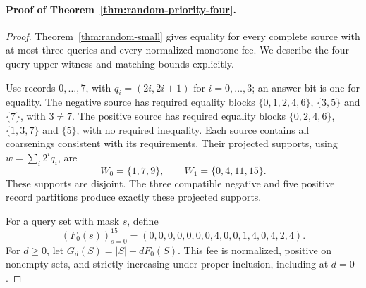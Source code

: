 \documentclass[pdflatex,sn-mathphys-num]{sn-jnl}
\theoremstyle{thmstyleone}
\theoremstyle{thmstylethree}
\theoremstyle{thmstyletwo}
\begin{document}
\paragraph*{Proof of Theorem~\ref{thm:random-priority-four}.}
\begin{proof}
Theorem~\ref{thm:random-small} gives equality for every complete source
with at most three queries and every normalized monotone fee. We describe
the four-query upper witness and matching bounds explicitly.

Use records $0,\ldots,7$, with $q_i=(2i,2i+1)$ for $i=0,\ldots,3$;
an answer bit is one for equality. The negative source has required
equality blocks $\{0,1,2,4,6\}$, $\{3,5\}$ and $\{7\}$, with
$3\ne7$. The positive source has required equality blocks
$\{0,2,4,6\}$, $\{1,3,7\}$ and $\{5\}$, with no required inequality.
Each source contains all coarsenings consistent with its requirements.
Their projected supports, using $w=\sum_i2^i q_i$, are
\[
 W_0=\{1,7,9\},\qquad W_1=\{0,4,11,15\}.
\]
These supports are disjoint. The three compatible negative and five
positive record partitions produce exactly these projected supports.

For a query set with mask $s$, define
\[
 (F_0(s))_{s=0}^{15}=
 (0,0,0,0,0,0,0,4,0,0,1,4,0,4,2,4).
\]
For $d\ge0$, let $G_d(S)=|S|+dF_0(S)$. This fee is normalized,
positive on nonempty sets, and strictly increasing under proper
inclusion, including at $d=0$.


\end{proof}
\end{document}
